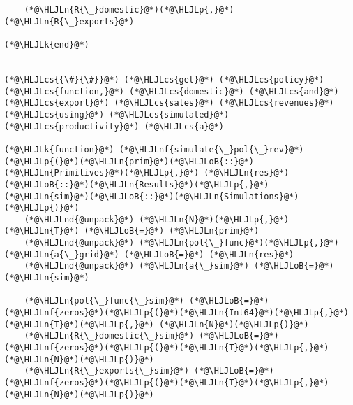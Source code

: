 \documentclass[12pt,a4paper]{article}
\newcommand{\HLJLk}[1]{\textcolor[RGB]{148,91,176}{\textbf{#1}}}
\newcommand{\HLJLn}[1]{#1}
\newcommand{\HLJLnd}[1]{\textcolor[RGB]{214,102,97}{#1}}
\newcommand{\HLJLnf}[1]{\textcolor[RGB]{66,102,213}{#1}}
\newcommand{\HLJLoB}[1]{\textcolor[RGB]{102,102,102}{\textbf{#1}}}
\newcommand{\HLJLp}[1]{#1}
\newcommand{\HLJLcs}[1]{\textcolor[RGB]{153,153,119}{\textit{#1}}}
\begin{document}
\begin{lstlisting}
    (*@\HLJLn{R{\_}domestic}@*)(*@\HLJLp{,}@*) (*@\HLJLn{R{\_}exports}@*)

(*@\HLJLk{end}@*)


(*@\HLJLcs{{\#}{\#}}@*) (*@\HLJLcs{get}@*) (*@\HLJLcs{policy}@*) (*@\HLJLcs{function,}@*) (*@\HLJLcs{domestic}@*) (*@\HLJLcs{and}@*) (*@\HLJLcs{export}@*) (*@\HLJLcs{sales}@*) (*@\HLJLcs{revenues}@*) (*@\HLJLcs{using}@*) (*@\HLJLcs{simulated}@*) (*@\HLJLcs{productivity}@*) (*@\HLJLcs{a}@*)

(*@\HLJLk{function}@*) (*@\HLJLnf{simulate{\_}pol{\_}rev}@*)(*@\HLJLp{(}@*)(*@\HLJLn{prim}@*)(*@\HLJLoB{::}@*)(*@\HLJLn{Primitives}@*)(*@\HLJLp{,}@*) (*@\HLJLn{res}@*)(*@\HLJLoB{::}@*)(*@\HLJLn{Results}@*)(*@\HLJLp{,}@*) (*@\HLJLn{sim}@*)(*@\HLJLoB{::}@*)(*@\HLJLn{Simulations}@*)(*@\HLJLp{)}@*)
    (*@\HLJLnd{@unpack}@*) (*@\HLJLn{N}@*)(*@\HLJLp{,}@*) (*@\HLJLn{T}@*) (*@\HLJLoB{=}@*) (*@\HLJLn{prim}@*)
    (*@\HLJLnd{@unpack}@*) (*@\HLJLn{pol{\_}func}@*)(*@\HLJLp{,}@*) (*@\HLJLn{a{\_}grid}@*) (*@\HLJLoB{=}@*) (*@\HLJLn{res}@*)
    (*@\HLJLnd{@unpack}@*) (*@\HLJLn{a{\_}sim}@*) (*@\HLJLoB{=}@*) (*@\HLJLn{sim}@*)

    (*@\HLJLn{pol{\_}func{\_}sim}@*) (*@\HLJLoB{=}@*) (*@\HLJLnf{zeros}@*)(*@\HLJLp{(}@*)(*@\HLJLn{Int64}@*)(*@\HLJLp{,}@*) (*@\HLJLn{T}@*)(*@\HLJLp{,}@*) (*@\HLJLn{N}@*)(*@\HLJLp{)}@*)
    (*@\HLJLn{R{\_}domestic{\_}sim}@*) (*@\HLJLoB{=}@*) (*@\HLJLnf{zeros}@*)(*@\HLJLp{(}@*)(*@\HLJLn{T}@*)(*@\HLJLp{,}@*) (*@\HLJLn{N}@*)(*@\HLJLp{)}@*)
    (*@\HLJLn{R{\_}exports{\_}sim}@*) (*@\HLJLoB{=}@*) (*@\HLJLnf{zeros}@*)(*@\HLJLp{(}@*)(*@\HLJLn{T}@*)(*@\HLJLp{,}@*) (*@\HLJLn{N}@*)(*@\HLJLp{)}@*)


\end{lstlisting}
\end{document}
